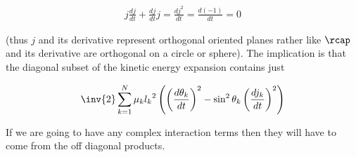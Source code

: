 \begin{align}\label{eqn:sPolarMultiPendulum:moo2}
j \frac{dj}{dt} + \frac{dj}{dt} j = \frac{d j^2}{dt} = \frac{d (-1)}{dt} = 0
\end{align}

(thus $j$ and its derivative represent orthogonal oriented planes rather like $\rcap$ and its derivative are orthogonal on a circle or sphere).  The implication is that the diagonal subset of the kinetic energy expansion contains just

\begin{align}\label{eqn:sPolarMultiPendulum:moo3}
\inv{2}
\sum_{k=1}^N
\mu_k
{l_k}^2
\left(
\left(\frac{d\theta_k}{dt}\right)^2 -\sin^2\theta_k \left(\frac{d j_k}{dt}\right)^2  \right)
\end{align}

If we are going to have any complex interaction terms then they will have to come from the off diagonal products.

\EndNoBibArticle
